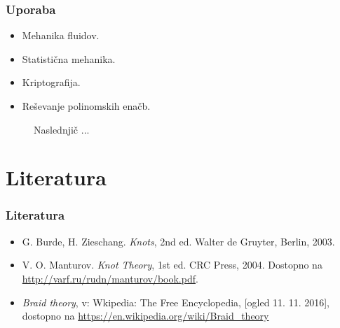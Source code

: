 \documentclass[9pt, table]{beamer}
\theoremstyle{remark}
\theoremstyle{definition}
\begin{document}
\begin{frame}
\frametitle{Uporaba}
\begin{itemize}
\item{Mehanika fluidov.}
\item{Statistična mehanika.}
\item{Kriptografija.}
\item{Reševanje polinomskih enačb.}
\end{itemize}
\end{frame}

\begin{frame}
\begin{figure}[c!]
Naslednjič ...
\end{figure}
\end{frame}

\section{Literatura}
\begin{frame}
\frametitle{Literatura}
\begin{itemize}
\item G. Burde, H. Zieschang. {\em Knots}, 2nd ed. Walter de Gruyter, Berlin, 2003.
\item V. O. Manturov. {\em Knot Theory}, 1st ed. CRC Press, 2004. Dostopno na \url{http://varf.ru/rudn/manturov/book.pdf}.
\item{\emph{Braid theory}, v: Wkipedia: The Free Encyclopedia, [ogled 11. 11. 2016], dostopno na \url{https://en.wikipedia.org/wiki/Braid_theory}}
\end{itemize}
\end{frame}
\end{document}
